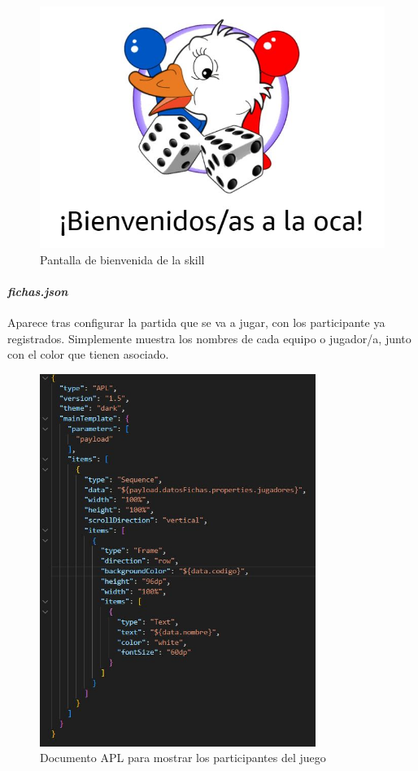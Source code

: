 \begin{figure}[H]
	\centering
	\includegraphics{imgs/interfaz-1.jpg}
	\caption{Pantalla de bienvenida de la skill}
	\label{fig:interfaz-1}
\end{figure}

\paragraph{\textit{fichas.json}}

Aparece tras configurar la partida que se va a jugar, con los participante ya registrados. Simplemente muestra los nombres de cada equipo o jugador/a, junto con el color que tienen asociado.

\begin{figure}[H]
	\centering
	\includegraphics[width=0.8\textwidth]{imgs/apl-fichas.jpg}
	\caption{Documento APL para mostrar los participantes del juego}
	\label{fig:apl-fichas}
\end{figure}

